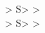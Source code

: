 \documentclass{article}
\begin{document}
\begin{beltgrid}[focus=abc]
> S> > \\
> S> >
\end{beltgrid}
\end{document}
